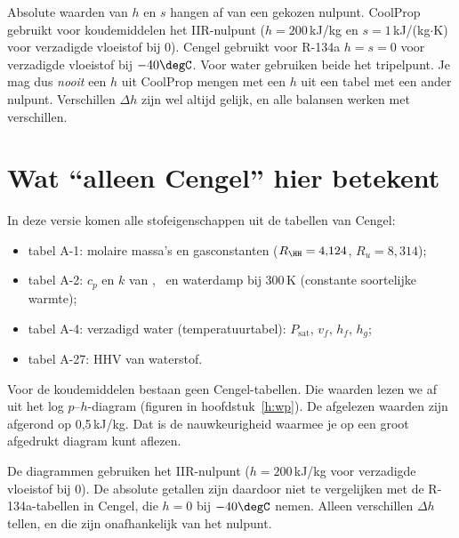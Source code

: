 \begin{letop}
Absolute waarden van $h$ en $s$ hangen af van een gekozen nulpunt. CoolProp gebruikt voor koudemiddelen het
IIR-nulpunt ($h=200$\,kJ/kg en $s=1$\,kJ/(kg$\cdot$K) voor verzadigde vloeistof bij 0\degC). Cengel gebruikt
voor R-134a $h=s=0$ voor verzadigde vloeistof bij $-40\degC$. Voor water gebruiken beide het tripelpunt. Je
mag dus \emph{nooit} een $h$ uit CoolProp mengen met een $h$ uit een tabel met een ander nulpunt. Verschillen
$\Delta h$ zijn wel altijd gelijk, en alle balansen werken met verschillen.
\end{letop}
\section{Wat ``alleen Cengel'' hier betekent}
In deze versie komen alle stofeigenschappen uit de tabellen van Cengel:
\begin{itemize}
  \item tabel A-1: molaire massa's en gasconstanten ($R_{\HH} = 4{,}124$, $R_u = 8{,}314$);
  \item tabel A-2: $c_p$ en $k$ van \OO, \HH\ en waterdamp bij 300\,K (constante soortelijke warmte);
  \item tabel A-4: verzadigd water (temperatuurtabel): $P_\mathrm{sat}$, $v_f$, $h_f$, $h_g$;
  \item tabel A-27: HHV van waterstof.
\end{itemize}
Voor de koudemiddelen bestaan geen Cengel-tabellen. Die waarden lezen we af uit het log $p$–$h$-diagram
(figuren in hoofdstuk~\ref{h:wp}). De afgelezen waarden zijn afgerond op 0,5\,kJ/kg. Dat is de nauwkeurigheid
waarmee je op een groot afgedrukt diagram kunt aflezen.
\begin{letop}
De diagrammen gebruiken het IIR-nulpunt ($h=200$\,kJ/kg voor verzadigde vloeistof bij 0\degC). De
absolute getallen zijn daardoor niet te vergelijken met de R-134a-tabellen in Cengel, die $h=0$ bij $-40\degC$
nemen. Alleen verschillen $\Delta h$ tellen, en die zijn onafhankelijk van het nulpunt.
\end{letop}
